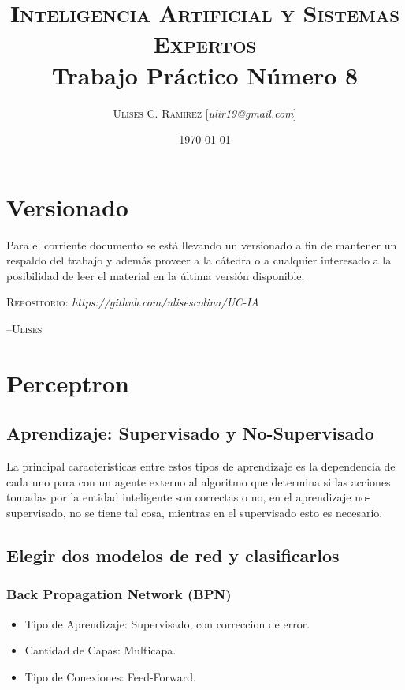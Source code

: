 \documentclass{article}
\title{\textsc{Inteligencia Artificial y Sistemas Expertos}\\Trabajo Práctico
Número 8}
\author{\textsc{Ulises C. Ramirez} [\textit{ulir19@gmail.com}]}
\date{\today}
\begin{document}
\maketitle
{}
\newpage

\section*{Versionado}
Para el corriente documento se est\'a llevando un versionado a fin de mantener
un respaldo del trabajo y adem\'as proveer a la c\'atedra o a cualquier
interesado a la posibilidad de leer el material en la \'ultima versi\'on disponible.\\

\begin{center}
  \textsc{Repositorio}: \textit{https://github.com/ulisescolina/UC-IA}
\end{center}

\hfill--\textsc{Ulises}
\tableofcontents
{}
\newpage

\section{Perceptron}
{\label{sec:perceptron}}

\subsection{Aprendizaje: Supervisado y No-Supervisado}
La principal caracteristicas entre estos tipos de aprendizaje es la dependencia
de cada uno para con un agente externo al algoritmo que determina si las
acciones tomadas por la entidad inteligente son correctas o no, en el
aprendizaje no-supervisado, no se tiene tal cosa, mientras en el supervisado
esto es necesario.

\subsection{Elegir dos modelos de red y clasificarlos}
\subsubsection{Back Propagation Network (BPN)}
\begin{itemize}
	\item Tipo de Aprendizaje: Supervisado, con correccion de error.
	\item Cantidad de Capas: Multicapa.
	\item Tipo de Conexiones: Feed-Forward.
\end{itemize}
\end{document}
